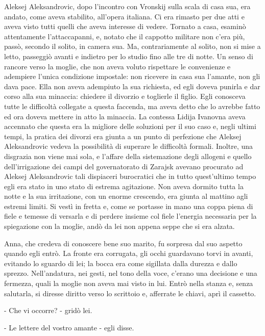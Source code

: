\label{iv-3} 

Aleksej Aleksandrovic, dopo l'incontro con Vronskij sulla scala di casa sua, era andato, come aveva stabilito, all'opera italiana. Ci era rimasto per due atti e aveva visto tutti quelli che aveva interesse di vedere. Tornato a casa, esaminò attentamente l'attaccapanni, e, notato che il cappotto militare non c'era più, passò, secondo il solito, in camera sua. Ma, contrariamente al solito, non si mise a letto, passeggiò avanti e indietro per lo studio fino alle tre di notte. Un senso di rancore verso la moglie, che non aveva voluto rispettare le convenienze e adempiere l'unica condizione impostale: non ricevere in casa sua l'amante, non gli dava pace. Ella non aveva adempiuto la sua richiesta, ed egli doveva punirla e dar corso alla sua minaccia: chiedere il divorzio e toglierle il figlio. Egli conosceva tutte le difficoltà collegate a questa faccenda, ma aveva detto che lo avrebbe fatto ed ora doveva mettere in atto la minaccia. La contessa Lidija Ivanovna aveva accennato che questa era la migliore delle soluzioni per il suo caso e, negli ultimi tempi, la pratica dei divorzi era giunta a un punto di perfezione che Aleksej Aleksandrovic vedeva la possibilità di superare le difficoltà formali. Inoltre, una disgrazia non viene mai sola, e l'affare della sistemazione degli allogeni e quello dell'irrigazione dei campi del governatorato di Zarajsk avevano procurato ad Aleksej Aleksandrovic tali dispiaceri burocratici che in tutto quest'ultimo tempo egli era stato in uno stato di estrema agitazione. Non aveva dormito tutta la notte e la sua irritazione, con un enorme crescendo, era giunta al mattino agli estremi limiti. Si vestì in fretta e, come se portasse in mano una coppa piena di fiele e temesse di versarla e di perdere insieme col fiele l'energia necessaria per la spiegazione con la moglie, andò da lei non appena seppe che si era alzata. 

Anna, che credeva di conoscere bene suo marito, fu sorpresa dal suo aspetto quando egli entrò. La fronte era corrugata, gli occhi guardavano torvi in avanti, evitando lo sguardo di lei; la bocca era come sigillata dalla durezza e dallo sprezzo. Nell'andatura, nei gesti, nel tono della voce, c'erano una decisione e una fermezza, quali la moglie non aveva mai visto in lui. Entrò nella stanza e, senza salutarla, si diresse diritto verso lo scrittoio e, afferrate le chiavi, aprì il cassetto. 

- Che vi occorre? - gridò lei. 

- Le lettere del vostro amante - egli disse. 

